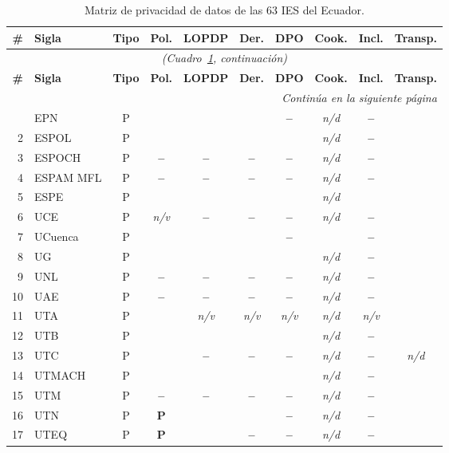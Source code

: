 \documentclass[11pt,a4paper]{article}
\newcommand{\si}{\ding{51}}
\newcommand{\no}{\textcolor{gris}{\textbf{--}}}
\newcommand{\pc}{\textbf{P}}
\newcommand{\nv}{\textsl{\footnotesize n/v}}
\newcommand{\nd}{\textsl{\footnotesize n/d}}
\begin{document}
\footnotesize
\begin{longtable}{@{}r l c c c c c c c c@{}}
	\caption{Matriz de privacidad de datos de las 63 IES del Ecuador.}\label{tab:ecuador}\\
	\toprule
	\textbf{\#} & \textbf{Sigla} & \textbf{Tipo} & \textbf{Pol.} & \textbf{LOPDP} & \textbf{Der.} & \textbf{DPO} & \textbf{Cook.} & \textbf{Incl.} & \textbf{Transp.} \\
	\midrule
	\endfirsthead
	\multicolumn{10}{c}{\textit{(Cuadro~\ref{tab:ecuador}, continuación)}}\\
	\toprule
	\textbf{\#} & \textbf{Sigla} & \textbf{Tipo} & \textbf{Pol.} & \textbf{LOPDP} & \textbf{Der.} & \textbf{DPO} & \textbf{Cook.} & \textbf{Incl.} & \textbf{Transp.} \\
	\midrule
	\endhead
	\midrule
	\multicolumn{10}{r}{\textit{Continúa en la siguiente página}}\\
	\endfoot
	\bottomrule
	\endlastfoot
	1 & EPN & P & \si & \si & \si & \no & \nd & \no & \si \\
	2 & ESPOL & P & \si & \si & \si & \si & \nd & \no & \si \\
	3 & ESPOCH & P & \no & \no & \no & \no & \nd & \no & \si \\
	4 & ESPAM MFL & P & \no & \no & \no & \no & \nd & \no & \si \\
	5 & ESPE & P & \si & \si & \si & \si & \nd & \si & \si \\
	6 & UCE & P & \nv & \no & \no & \no & \nd & \no & \si \\
	7 & UCuenca & P & \si & \si & \si & \no & \si & \no & \si \\
	8 & UG & P & \si & \si & \si & \si & \nd & \no & \si \\
	9 & UNL & P & \no & \no & \no & \no & \nd & \no & \si \\
	10 & UAE & P & \no & \no & \no & \no & \nd & \no & \si \\
	11 & UTA & P & \si & \nv & \nv & \nv & \nd & \nv & \si \\
	12 & UTB & P & \si & \si & \si & \si & \nd & \no & \si \\
	13 & UTC & P & \si & \no & \no & \no & \nd & \no & \nd \\
	14 & UTMACH & P & \si & \si & \si & \si & \nd & \no & \si \\
	15 & UTM & P & \no & \no & \no & \no & \nd & \no & \si \\
	16 & UTN & P & \pc & \si & \si & \no & \nd & \no & \si \\
	17 & UTEQ & P & \pc & \si & \no & \no & \nd & \no & \si \\

\end{longtable}
\end{document}
